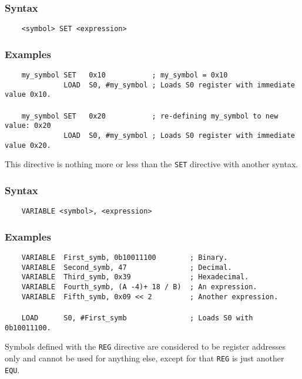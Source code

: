     \subsubsection{Syntax}
        \verb'    <symbol> SET <expression>'

    \subsubsection{Examples}
        \verb'    my_symbol SET   0x10           ; my_symbol = 0x10'\\
        \verb'              LOAD  S0, #my_symbol ; Loads S0 register with immediate value 0x10.'\\
        \verb''\\
        \verb'    my_symbol SET   0x20           ; re-defining my_symbol to new value: 0x20'\\
        \verb'              LOAD  S0, #my_symbol ; Loads S0 register with immediate value 0x20.'

    This directive is nothing more or less than the \texttt{SET} directive with another syntax.

    \subsubsection{Syntax}
        \verb'    VARIABLE <symbol>, <expression>'

    \subsubsection{Examples}
        \verb'    VARIABLE  First_symb, 0b10011100        ; Binary.'\\
        \verb'    VARIABLE  Second_symb, 47               ; Decimal.'\\
        \verb'    VARIABLE  Third_symb, 0x39              ; Hexadecimal.'\\
        \verb'    VARIABLE  Fourth_symb, (A -4)+ 18 / B)  ; An expression.'\\
        \verb'    VARIABLE  Fifth_symb, 0x09 << 2         ; Another expression.'\\
        \verb''\\
        \verb'    LOAD      S0, #First_symb               ; Loads S0 with 0b10011100.'

\clearpage
{}
    Symbols defined with the \texttt{REG} directive are considered to be register addresses only and cannot be used for anything else, except for that \texttt{REG} is just another \texttt{EQU}.


